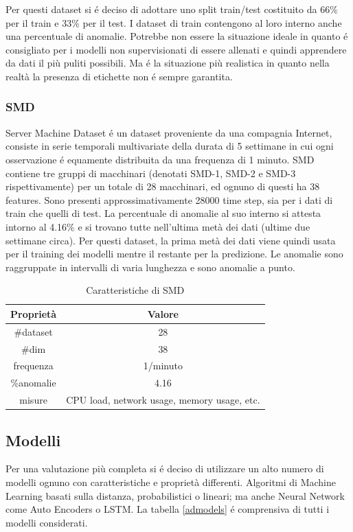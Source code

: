 Per questi dataset si é deciso di adottare uno split train/test costituito da 66\% per il train e 33\% per il test. I dataset di train contengono al loro interno anche una percentuale di anomalie. Potrebbe non essere la situazione ideale in quanto é consigliato per i modelli non supervisionati di essere allenati e quindi apprendere da dati il più puliti possibili. Ma é la situazione più realistica in quanto nella realtà la presenza di etichette non é sempre garantita.  

\subsubsection{SMD}
Server Machine Dataset é un dataset proveniente da una compagnia Internet, consiste in serie temporali multivariate della durata di 5 settimane in cui ogni osservazione é equamente distribuita da una frequenza di 1 minuto. SMD contiene tre gruppi di macchinari (denotati SMD-1, SMD-2 e SMD-3 rispettivamente) per un totale di 28 macchinari, ed ognuno di questi ha 38 features. Sono presenti approssimativamente 28000 time step, sia per i dati di train che quelli di test. 
La percentuale di anomalie al suo interno si attesta intorno al 4.16\% e si trovano tutte nell'ultima metà dei dati (ultime due settimane circa). Per questi dataset, la prima metà dei dati viene quindi usata per il training dei modelli mentre il restante per la predizione.
Le anomalie sono raggruppate in intervalli di varia lunghezza e sono anomalie a punto.
\begin{table}
\centering
\caption{\label{smd}Caratteristiche di SMD}
\begin{tabular}{|c|c|} 
\hline
\textbf{Proprietà} & \textbf{Valore}                              \\ 
\hline
\#dataset     & 28                                           \\ 
\hline
\#dim     & 38                                           \\ 
\hline
frequenza         & 1/minuto                                  
                                   \\ 
\hline
\%anomalie & 4.16                                         \\ 
\hline
misure              & CPU load, network usage, memory usage, etc.  \\
\hline
\end{tabular}
\end{table}


\subsection{Modelli}
Per una valutazione più completa si é deciso di utilizzare un alto numero di modelli ognuno con caratteristiche e proprietà differenti. Algoritmi di Machine Learning basati sulla distanza, probabilistici o lineari; ma anche Neural Network come Auto Encoders o LSTM. La tabella \ref{admodels} é comprensiva di tutti i modelli considerati.

